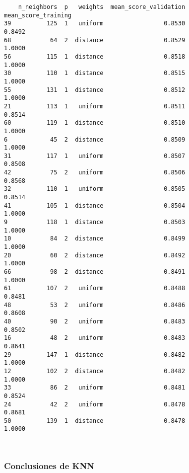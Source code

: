 \documentclass[11pt]{article}
\begin{document}
    
    \begin{verbatim}
    n_neighbors  p   weights  mean_score_validation  mean_score_training
39          125  1   uniform                 0.8530               0.8492
68           64  2  distance                 0.8529               1.0000
56          115  1  distance                 0.8518               1.0000
30          110  1  distance                 0.8515               1.0000
55          131  1  distance                 0.8512               1.0000
21          113  1   uniform                 0.8511               0.8514
60          119  1  distance                 0.8510               1.0000
6            45  2  distance                 0.8509               1.0000
31          117  1   uniform                 0.8507               0.8508
42           75  2   uniform                 0.8506               0.8568
32          110  1   uniform                 0.8505               0.8514
41          105  1  distance                 0.8504               1.0000
9           118  1  distance                 0.8503               1.0000
10           84  2  distance                 0.8499               1.0000
20           60  2  distance                 0.8492               1.0000
66           98  2  distance                 0.8491               1.0000
61          107  2   uniform                 0.8488               0.8481
48           53  2   uniform                 0.8486               0.8608
40           90  2   uniform                 0.8483               0.8502
16           48  2   uniform                 0.8483               0.8641
29          147  1  distance                 0.8482               1.0000
12          102  2  distance                 0.8482               1.0000
33           86  2   uniform                 0.8481               0.8524
24           42  2   uniform                 0.8478               0.8681
50          139  1  distance                 0.8478               1.0000
    \end{verbatim}

    
    \begin{Verbatim}[commandchars=\\\{\}]
 

    \end{Verbatim}

    \subsubsection{Conclusiones de KNN}\label{conclusiones-de-knn}
\end{document}
